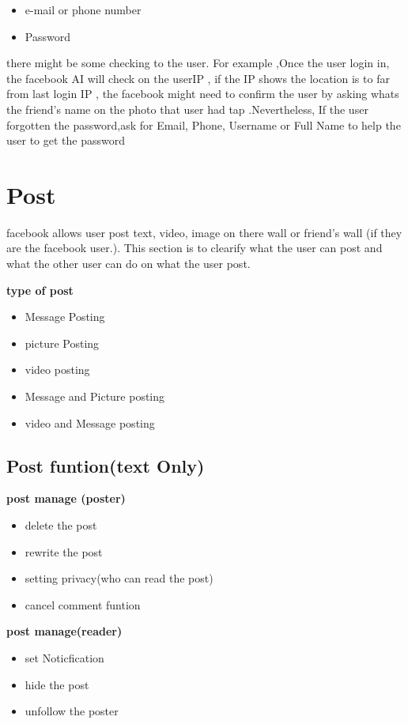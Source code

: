 \begin{itemize}
\item e-mail or phone number 
\item Password 
\end{itemize}

there might be some checking to the user. For example ,Once the user login in,
the facebook AI will check on the userIP , if the IP shows the location is to
far from last login IP , the facebook might need to confirm the user by asking
whats the friend's name on the photo that user had tap .Nevertheless, If the
user forgotten the password,ask for Email, Phone, Username or Full Name to help
the user to get the password

\section{Post}
facebook allows user post text, video, image on there wall or friend's wall (if
they are the facebook user.). This section is to clearify what the user can post
and what the other user can do on what the user post.

\textbf{type of post}
\begin{itemize}
\item Message Posting 
\item picture Posting
\item video posting
\item Message and Picture posting
\item video and Message posting
\end{itemize}

\subsection{Post funtion(text Only)}
\textbf{post manage (poster)}
\begin{itemize}
\item delete the post
\item rewrite the post
\item setting privacy(who can read the post)
\item cancel comment funtion
\end{itemize}

\textbf{post manage(reader)}
\begin{itemize}
\item set Noticfication
\item hide the post 
\item unfollow the poster
\end{itemize}

